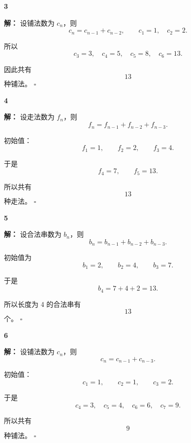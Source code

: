 \documentclass[11pt,a4paper,fontset=fandol]{ctexart}
\theoremstyle{formaltheorem}
\theoremstyle{formalexample}
\newenvironment{solution}{\par\noindent\textbf{解：}}{\hfill$\square$\par}
\begin{document}
\textbf{3}\begin{solution}
设铺法数为 $c_n$，则
\[
  c_n=c_{n-1}+c_{n-2},
  \qquad
  c_1=1,
  \quad
  c_2=2.
\]

所以
\[
  c_3=3,
  \quad
  c_4=5,
  \quad
  c_5=8,
  \quad
  c_6=13.
\]

因此共有
\[
  13
\]
种铺法。
\end{solution}

\textbf{4}\begin{solution}
设走法数为 $f_n$，则
\[
  f_n=f_{n-1}+f_{n-2}+f_{n-3}.
\]

初始值：
\[
  f_1=1,
  \qquad
  f_2=2,
  \qquad
  f_3=4.
\]

于是
\[
  f_4=7,
  \qquad
  f_5=13.
\]

所以共有
\[
  13
\]
种走法。
\end{solution}

\textbf{5}\begin{solution}
设合法串数为 $b_n$，则
\[
  b_n=b_{n-1}+b_{n-2}+b_{n-3}.
\]

初始值为
\[
  b_1=2,
  \qquad
  b_2=4,
  \qquad
  b_3=7.
\]

于是
\[
  b_4=7+4+2=13.
\]

所以长度为 4 的合法串有
\[
  13
\]
个。
\end{solution}

\textbf{6}\begin{solution}
设铺法数为 $c_n$，则
\[
  c_n=c_{n-1}+c_{n-3}.
\]

初始值：
\[
  c_1=1,
  \qquad
  c_2=1,
  \qquad
  c_3=2.
\]

于是
\[
  c_4=3,
  \quad
  c_5=4,
  \quad
  c_6=6,
  \quad
  c_7=9.
\]

所以共有
\[
  9
\]
种铺法。
\end{solution}
\end{document}
